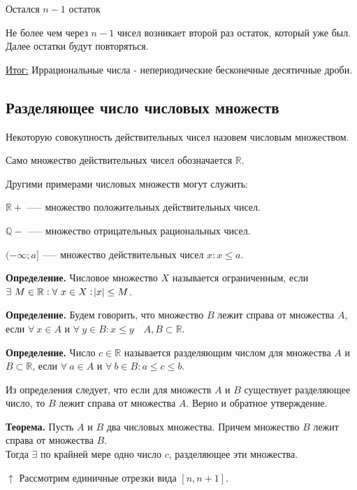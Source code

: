 \documentclass{article}
\begin{document}
        Остался $n - 1$ остаток

        Не более чем через $n - 1$ чисел возникает второй раз остаток, который уже был. Далее остатки будут повторяться.

        \underline{Итог:} Иррациональные числа - непериодические бесконечные десятичные дроби. 

        \subsection{Разделяющее число числовых множеств}
        Некоторую совокупность действительных чисел назовем числовым множеством.
        
        Само множество действительных чисел обозначается $\mathbb{R}$.
        
        Другими примерами числовых множеств могут служить:
        
        $\mathbb{R}+$ —-- множество положительных действительных чисел.
        
        $\mathbb{Q}-$ —-- множество отрицательных рациональных чисел.
        
        $(-\infty; a]$ —-- множество действительных чисел $x: x \leq a$.

        \textbf{Определение.} Числовое множество $X$ называется ограниченным, если $\exists\ M \in \mathbb{R}: \forall\ x \in X: \abs{x} \leq M$.

        \textbf{Определение.} Будем говорить, что множество $B$ лежит справа от множества $A$, если $\forall\ x \in A$ и $\forall\ y \in B: x \leq y \quad A, B \subset \mathbb{R}$.

        

        \textbf{Определение.} Число $c \in \mathbb{R}$ называется разделяющим числом для множества $A$ и $B \subset \mathbb{R}$, если $\forall\ a \in A$ и $\forall\ b \in B: a \leq c \leq b$.

        Из определения следует, что если для множеств $A$ и $B$ существует разделяющее число, то $B$ лежит справа от множества $A$. Верно и обратное утверждение.

        \textbf{Теорема.} Пусть $A$ и $B$ два числовых множества. Причем множество $B$ лежит справа от множества $B$.\\
        Тогда $\exists$ по крайней мере одно число $c$, разделяющее эти множества.

        $\uparrow$
        Рассмотрим единичные отрезки вида $[n,n+1]$.
            
\end{document}
